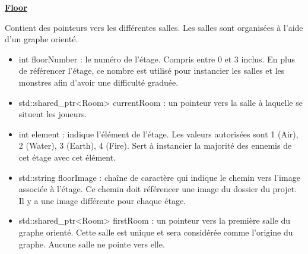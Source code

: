 \underline{\textbf{Floor}}
\par Contient des pointeurs vers les différentes salles. Les salles sont organisées à l'aide d'un graphe orienté. 
\begin{itemize}
    \item int floorNumber : le numéro de l'étage. Compris entre 0 et 3 inclus. En plus de référencer l'étage, ce nombre est utilisé pour instancier les salles et les monstres afin d'avoir une difficulté graduée.
    \item std::shared\_ptr<Room> currentRoom : un pointeur vers la salle à laquelle se situent les joueurs.
    \item int element : indique l'élément de l'étage. Les valeurs autorisées sont 1 (Air), 2 (Water), 3 (Earth), 4 (Fire). Sert à instancier la majorité des ennemis de cet étage avec cet élément.
    \item std::string floorImage : chaîne de caractère qui indique le chemin vers l'image associée à l'étage. Ce chemin doit référencer une image du dossier du projet. Il y a une image différente pour chaque étage.
    \item std::shared\_ptr<Room> firstRoom : un pointeur vers la première salle du graphe orienté. Cette salle est unique et sera considérée comme l'origine du graphe. Aucune salle ne pointe vers elle.
    
\end{itemize}

